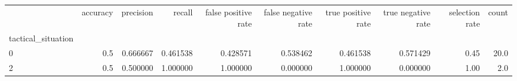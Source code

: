 \begin{tabular}{lrrrrrrrrr}
\toprule
{} &  accuracy &  precision &    recall &  false positive rate &  false negative rate &  true positive rate &  true negative rate &  selection rate &  count \\
tactical\_situation &           &            &           &                      &                      &                     &                     &                 &        \\
\midrule
0                  &       0.5 &   0.666667 &  0.461538 &             0.428571 &             0.538462 &            0.461538 &            0.571429 &            0.45 &   20.0 \\
2                  &       0.5 &   0.500000 &  1.000000 &             1.000000 &             0.000000 &            1.000000 &            0.000000 &            1.00 &    2.0 \\
\bottomrule
\end{tabular}
